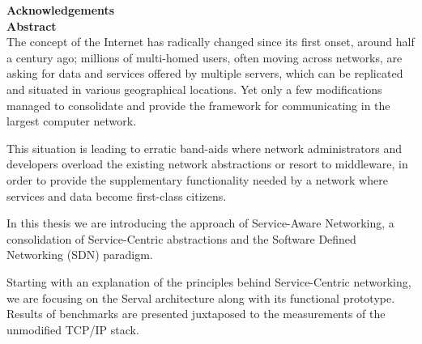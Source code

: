\documentclass[12pt,a4paper,oneside]{article}
\begin{document}
\newcommand{\chapterpage}[2]{
	\newpage
	\thispagestyle{empty}
	\phantomsection
	\addcontentsline{toc}{part}{#1}
	{\Huge \bf \noindent #2}
	\newpage
}

\newpage
\pagestyle{empty}
\mbox{}

\newpage
\setcounter{page}{2}


\newpage
\pagestyle{plain}
{\Large \bf \noindent Acknowledgements} \\[0.5cm]


\newpage
\thispagestyle{empty}
{\Large \bf \noindent Abstract} \\[0.13cm]

\noindent The concept of the Internet has radically changed since its first onset, around half a century ago; millions of multi-homed users, often moving across networks, are asking for data and services offered by multiple servers, which can be replicated and situated in various geographical locations.
Yet only a few modifications managed to consolidate and provide the framework for communicating in the largest computer network.

This situation is leading to erratic band-aids where network administrators and developers overload the existing network abstractions or resort to middleware, in order to provide the supplementary functionality needed by a network where services and data become first-class citizens.

In this thesis we are introducing the approach of Service-Aware Networking, a consolidation of Service-Centric abstractions and the Software Defined Networking (SDN) paradigm.

Starting with an explanation of the principles behind Service-Centric networking, we are focusing on the Serval architecture along with its functional prototype.
Results of benchmarks are presented juxtaposed to the measurements of the unmodified TCP/IP stack.
\end{document}
